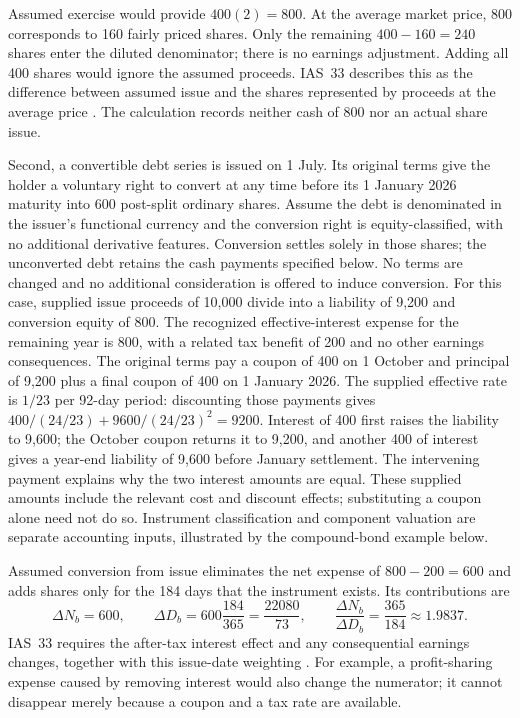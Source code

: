Assumed exercise would provide $400(2)=800$. At the average market price,
800 corresponds to 160 fairly priced shares. Only the remaining
$400-160=240$ shares enter the diluted denominator; there is no earnings
adjustment. Adding all 400 shares would ignore the assumed proceeds.
IAS~33 describes this as the difference between assumed issue and the
shares represented by proceeds at the average price
\citep[IAS~33, paragraphs 45--47 and A4--A5]{eu20231803}.
The calculation records neither cash of 800 nor an actual share issue.

Second, a convertible debt series is issued on 1 July. Its original terms
give the holder a voluntary right to convert at any time before its
1 January 2026 maturity into 600 post-split ordinary shares. Assume the
debt is denominated in the issuer's functional currency and the conversion
right is equity-classified, with no additional derivative features.
Conversion settles solely in those shares; the unconverted debt retains
the cash payments specified below. No terms are changed and no additional
consideration is offered to induce conversion. For this case,
supplied issue proceeds of 10,000 divide into a liability of 9,200 and
conversion equity of 800. The recognized effective-interest expense for
the remaining year is 800, with a related tax benefit of 200 and no other
earnings consequences. The original terms pay a coupon of 400 on 1 October
and principal of 9,200 plus a final coupon of 400 on 1 January 2026.
The supplied effective rate is $1/23$ per 92-day period: discounting those
payments gives $400/(24/23)+9600/(24/23)^2=9200$.
Interest of 400 first raises the liability to 9,600; the October coupon
returns it to 9,200, and another 400 of interest gives a year-end liability
of 9,600 before January settlement. The intervening payment explains why
the two interest amounts are equal. These supplied amounts include the
relevant cost and discount effects; substituting a coupon alone need not do so.
Instrument classification and component valuation are separate accounting
inputs, illustrated by the compound-bond example below.

Assumed conversion from issue eliminates the net expense of
$800-200=600$ and adds shares only for the 184 days that the instrument
exists. Its contributions are
\[
 \Delta N_b=600,\qquad
 \Delta D_b=600\frac{184}{365}=\frac{22080}{73},
 \qquad
 \frac{\Delta N_b}{\Delta D_b}=\frac{365}{184}\approx1.9837.
\]
IAS~33 requires the after-tax interest effect and any consequential
earnings changes, together with this issue-date weighting
\citep[IAS~33, paragraphs 33--39, 49--50]{eu20231803}.
For example, a profit-sharing expense caused by removing interest would
also change the numerator; it cannot disappear merely because a coupon
and a tax rate are available.

